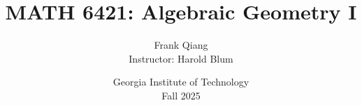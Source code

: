\documentclass[12pt, letterpaper, oneside]{book}
\title{MATH 6421: Algebraic Geometry I}
\author{Frank Qiang\\Instructor: Harold Blum}
\date{Georgia Institute of Technology\\Fall 2025}
\theoremstyle{definition}
\begin{document}
  \maketitle

  \begingroup
  \let\cleardoublepage\clearpage
  \tableofcontents
  \endgroup

  
  
  
  
\end{document}
